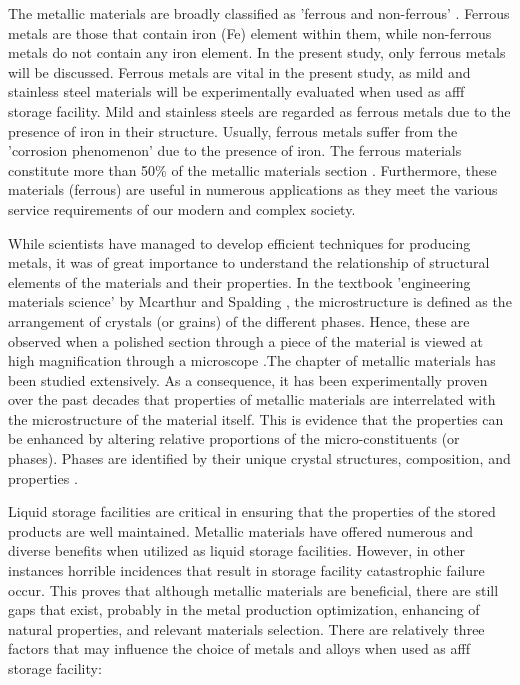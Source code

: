 The metallic materials are broadly classified as 'ferrous and non-ferrous' \cite{rawlings2009materials}. Ferrous metals are those that contain iron (Fe) element within them, while non-ferrous metals do not contain any iron element. In the present study, only ferrous metals will be discussed. Ferrous metals are vital in the present study, as mild and stainless steel materials will be experimentally evaluated when used as \acrshort{afff} storage facility.  Mild and stainless steels are regarded as ferrous metals due to the presence of iron in their structure. Usually, ferrous metals suffer from the 'corrosion phenomenon' due to the presence of iron. The ferrous materials constitute more than 50\% of the metallic materials section \cite{rawlings2009materials}. Furthermore, these materials (ferrous) are useful in numerous applications as they meet the various service requirements of our modern and complex society.

While scientists have managed to develop efficient techniques for producing metals, it was of great importance to understand the relationship of structural elements of the materials and their properties. In the textbook 'engineering materials science' by Mcarthur and Spalding \cite{mcarthur2004engineering}, the microstructure is defined as the arrangement of crystals (or grains) of the different phases. Hence, these are observed when a polished section through a piece of the material is viewed at high magnification through a microscope \cite{molabe2018determining}.The chapter of metallic materials has been studied extensively. As a consequence, it has been experimentally proven over the past decades that properties of metallic materials are interrelated with the microstructure of the material itself. This is evidence that the properties can be enhanced by altering relative proportions of the micro-constituents (or phases). Phases are identified by their unique crystal structures, composition, and properties \cite{mcarthur2004engineering}.

Liquid storage facilities are critical in ensuring that the properties of the stored products are well maintained. Metallic materials have offered numerous and diverse benefits when utilized as liquid storage facilities. However, in other instances horrible incidences that result in storage facility catastrophic failure occur. This proves that although metallic materials are beneficial, there are still gaps that exist, probably in the metal production optimization, enhancing of natural properties, and relevant materials selection. There are relatively three factors that may influence the choice of metals and alloys when used as \acrshort{afff} storage facility:

